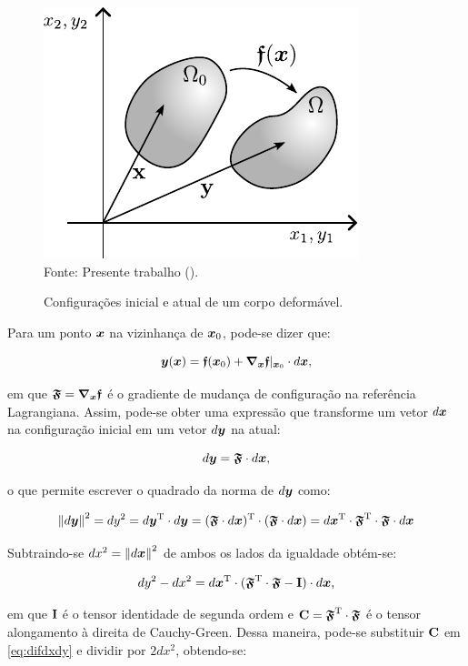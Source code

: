 \begin{figure}[h!]
    \centering
    \caption{Configurações inicial e atual de um corpo deformável.}
    \includegraphics[width=.4\linewidth]{Figuras/Cont.pdf}
    \\Fonte: Presente trabalho (\the\year).
    \label{fig:Cont}
\end{figure}

Para um ponto $\boldsymbol{x}$ na vizinhança de $\boldsymbol{x}_0$, pode-se dizer que:

\begin{equation}
    \boldsymbol{y}(\boldsymbol{x})=\boldsymbol{\mathfrak{f}}(\boldsymbol{x}_0)+\boldsymbol{\nabla_x}\boldsymbol{\mathfrak{f}}|_{\boldsymbol{x}_0}\cdot d\boldsymbol{x}\text{,}
\end{equation}

\noindent em que $\boldsymbol{\mathfrak{F}}=\boldsymbol{\nabla_x}\boldsymbol{\mathfrak{f}}$ é o gradiente de mudança de configuração na referência Lagrangiana. Assim, pode-se obter uma expressão que transforme um vetor $d\boldsymbol{x}$ na configuração inicial em um vetor $d\boldsymbol{y}$ na atual:

\begin{equation}
    d\boldsymbol{y}=\boldsymbol{\mathfrak{F}}\cdot d\boldsymbol{x}\text{,}\label{eq:dyAdx}
\end{equation}

\noindent o que permite escrever o quadrado da norma de $d\boldsymbol{y}$ como:

\[
    \left\lVert{d\boldsymbol{y}}\right\lVert^2=dy^2=d\boldsymbol{y}^\mathrm{T}\cdot d\boldsymbol{y}=(\boldsymbol{\mathfrak{F}}\cdot d\boldsymbol{x})^\mathrm{T}\cdot(\boldsymbol{\mathfrak{F}}\cdot d\boldsymbol{x})=d\boldsymbol{x}^\mathrm{T}\cdot\boldsymbol{\mathfrak{F}}^\mathrm{T}\cdot\boldsymbol{\mathfrak{F}}\cdot d\boldsymbol{x}
\]

Subtraindo-se $dx^2=\left\lVert{d\boldsymbol{x}}\right\lVert^2$ de ambos os lados da igualdade obtém-se:

\begin{equation}
    dy^2-dx^2=d\boldsymbol{x}^\mathrm{T}\cdot(\boldsymbol{\mathfrak{F}}^\mathrm{T}\cdot\boldsymbol{\mathfrak{F}}-\mathbf{I})\cdot d\boldsymbol{x}\text{,}
    \label{eq:difdxdy}
\end{equation}

\noindent em que $\mathbf{I}$ é o tensor identidade de segunda ordem e $\mathbf{C}=\boldsymbol{\mathfrak{F}}^\mathrm{T}\cdot\boldsymbol{\mathfrak{F}}$ é o tensor alongamento à direita de Cauchy-Green. Dessa maneira, pode-se substituir $\mathbf{C}$ em \eqref{eq:difdxdy} e dividir por $2dx^2$, obtendo-se:

